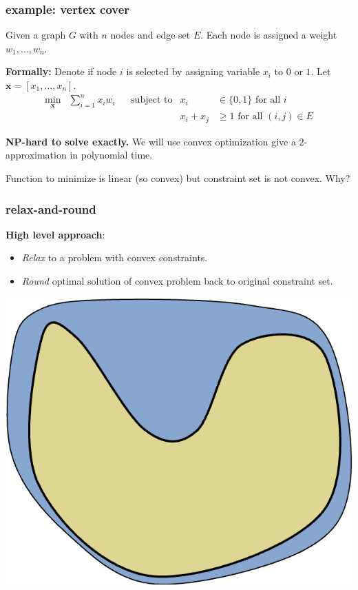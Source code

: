 \documentclass[compress]{beamer}
\newcommand{\bv}[1]{\mathbf{#1}}
\begin{document}
\begin{frame}[t]
	\frametitle{example: vertex cover}
	Given a graph $G$ with $n$ nodes and edge set $E$. Each node is assigned a weight $w_1, \ldots, w_n$.

	\textbf{Formally:} Denote if node $i$ is selected by assigning variable $x_i$ to $0$ or $1$. Let $\bv{x} = [x_1, \ldots, x_n]$.
	\begin{align*}
		\min_{\bv{x}} &\sum_{i=1}^n x_i w_i & &\text{subject to} & x_i &\in \{0,1\} \text{ for all $i$}\\
		&&&& x_i + x_j &\geq 1 \text{ for all } (i,j) \in E
	\end{align*}

	\textbf{NP-hard to solve exactly.} We will use convex optimization give a $2$-approximation in polynomial time.

	Function to minimize is linear (so convex) but constraint set is not convex. Why?
\end{frame}

\begin{frame}[t]
	\frametitle{relax-and-round}
	\textbf{High level approach}: 
	\begin{itemize}
		\item \emph{Relax} to a problem with convex constraints. 
		\item \emph{Round} optimal solution of convex problem back to original constraint set.
	\end{itemize}
	\begin{center}
		\includegraphics[width=.5\textwidth]{relaxround1.png}
	\end{center}
\end{frame}
\end{document}

